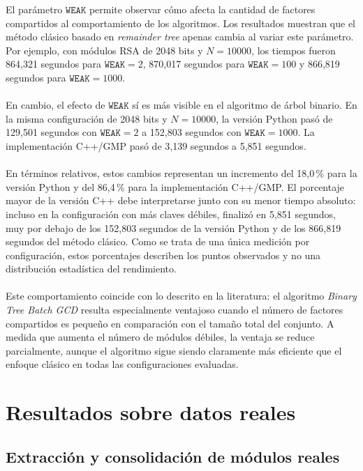 El parámetro \(\texttt{WEAK}\) permite observar cómo afecta la cantidad de factores compartidos al comportamiento de los algoritmos. Los resultados muestran que el método clásico basado en \textit{remainder tree} apenas cambia al variar este parámetro. Por ejemplo, con módulos RSA de 2048 bits y \(N=10000\), los tiempos fueron 864,321 segundos para \(\texttt{WEAK}=2\), 870,017 segundos para \(\texttt{WEAK}=100\) y 866,819 segundos para \(\texttt{WEAK}=1000\).
\\
\\
En cambio, el efecto de \(\texttt{WEAK}\) sí es más visible en el algoritmo de árbol binario. En la misma configuración de 2048 bits y \(N=10000\), la versión Python pasó de 129,501 segundos con \(\texttt{WEAK}=2\) a 152,803 segundos con \(\texttt{WEAK}=1000\). La implementación C++/GMP pasó de 3,139 segundos a 5,851 segundos.
\\
\\
En términos relativos, estos cambios representan un incremento del 18,0\,\%
para la versión Python y del 86,4\,\% para la implementación C++/GMP. El
porcentaje mayor de la versión C++ debe interpretarse junto con su menor tiempo
absoluto: incluso en la configuración con más claves débiles, finalizó en
5,851 segundos, muy por debajo de los 152,803 segundos de la versión Python y
de los 866,819 segundos del método clásico. Como se trata de una única medición
por configuración, estos porcentajes describen los puntos observados y no una
distribución estadística del rendimiento.
\\
\\
Este comportamiento coincide con lo descrito en la literatura: el algoritmo \textit{Binary Tree Batch GCD} resulta especialmente ventajoso cuando el número de factores compartidos es pequeño en comparación con el tamaño total del conjunto. A medida que aumenta el número de módulos débiles, la ventaja se reduce parcialmente, aunque el algoritmo sigue siendo claramente más eficiente que el enfoque clásico en todas las configuraciones evaluadas.

\section{Resultados sobre datos reales}

\subsection{Extracción y consolidación de módulos reales}

